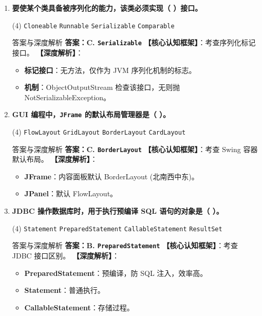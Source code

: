 ﻿\documentclass[12pt, a4paper]{ctexart}
\newcommand{\code}[1]{\texttt{#1}}
\begin{document}
\begin{enumerate}[label=\textbf{\arabic*.}, leftmargin=*, itemsep=1.5em]
	\item \textbf{要使某个类具备被序列化的能力，该类必须实现（ \quad ）接口。}
	      \begin{tasks}(4)
		      \task \code{Cloneable} \task \code{Runnable} \task \code{Serializable} \task \code{Comparable}
	      \end{tasks}
	      \begin{bluebox}{答案与深度解析}
		      \textbf{答案：C. \code{Serializable}}
		      \textbf{【核心认知框架】}：考查序列化标记接口。
		      \textbf{【深度解析】}：
		      \begin{itemize}[leftmargin=*, nosep]
			      \item \textbf{标记接口}：无方法，仅作为 JVM 序列化机制的标志。
			      \item \textbf{机制}：ObjectOutputStream 检查该接口，无则抛 NotSerializableException。
		      \end{itemize}
	      \end{bluebox}

	\item \textbf{GUI 编程中，\code{JFrame} 的默认布局管理器是（ \quad ）。}
	      \begin{tasks}(4)
		      \task \code{FlowLayout} \task \code{GridLayout} \task \code{BorderLayout} \task \code{CardLayout}
	      \end{tasks}
	      \begin{bluebox}{答案与深度解析}
		      \textbf{答案：C. \code{BorderLayout}}
		      \textbf{【核心认知框架】}：考查 Swing 容器默认布局。
		      \textbf{【深度解析】}：
		      \begin{itemize}[leftmargin=*, nosep]
			      \item \textbf{JFrame}：内容面板默认 BorderLayout (北南西中东)。
			      \item \textbf{JPanel}：默认 FlowLayout。
		      \end{itemize}
	      \end{bluebox}

	\item \textbf{JDBC 操作数据库时，用于执行预编译 SQL 语句的对象是（ \quad ）。}
	      \begin{tasks}(4)
		      \task \code{Statement} \task \code{PreparedStatement} \task \code{CallableStatement} \task \code{ResultSet}
	      \end{tasks}
	      \begin{bluebox}{答案与深度解析}
		      \textbf{答案：B. \code{PreparedStatement}}
		      \textbf{【核心认知框架】}：考查 JDBC 接口区别。
		      \textbf{【深度解析】}：
		      \begin{itemize}[leftmargin=*, nosep]
			      \item \textbf{PreparedStatement}：预编译，防 SQL 注入，效率高。
			      \item \textbf{Statement}：普通执行。
			      \item \textbf{CallableStatement}：存储过程。
		      \end{itemize}
	      \end{bluebox}
\end{enumerate}
\end{document}
